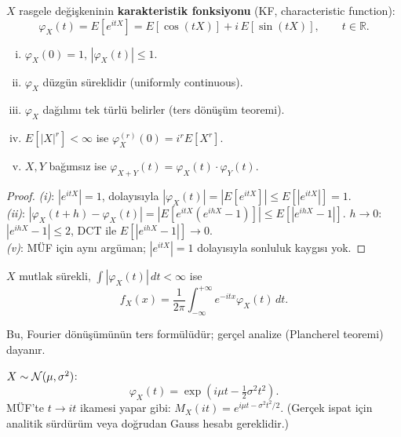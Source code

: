 \begin{tanim}
\label{def:kf}
$X$ rasgele değişkeninin \textbf{karakteristik fonksiyonu} (KF, characteristic function):
\[
  \varphi_X(t) = E[e^{itX}] = E[\cos(tX)] + i \, E[\sin(tX)], \qquad t \in \mathbb{R}.
\]
\end{tanim}

\begin{teorem}
\label{thm:kf_ozellik}
\begin{enumerate}[(i)]
  \item $\varphi_X(0) = 1$, $|\varphi_X(t)| \leq 1$.
  \item $\varphi_X$ düzgün süreklidir (uniformly continuous).
  \item $\varphi_X$ dağılımı tek türlü belirler (ters dönüşüm teoremi).
  \item $E[|X|^r] < \infty$ ise $\varphi_X^{(r)}(0) = i^r E[X^r]$.
  \item $X, Y$ bağımsız ise $\varphi_{X+Y}(t) = \varphi_X(t) \cdot \varphi_Y(t)$.
\end{enumerate}
\end{teorem}

\begin{proof}
\textit{(i)}: $|e^{itX}| = 1$, dolayısıyla $|\varphi_X(t)| = |E[e^{itX}]| \leq E[|e^{itX}|] = 1$.\\
\textit{(ii)}: $|\varphi_X(t+h) - \varphi_X(t)| = |E[e^{itX}(e^{ihX}-1)]| \leq E[|e^{ihX}-1|]$.
$h \to 0$: $|e^{ihX}-1| \leq 2$, DCT ile $E[|e^{ihX}-1|] \to 0$.\\
\textit{(v)}: MÜF için aynı argüman; $|e^{itX}|=1$ dolayısıyla sonluluk kaygısı yok.
\end{proof}

\begin{teorem}
\label{thm:kf_ters}
$X$ mutlak sürekli, $\int |\varphi_X(t)| \, dt < \infty$ ise
\[
  f_X(x) = \frac{1}{2\pi} \int_{-\infty}^{+\infty} e^{-itx} \varphi_X(t) \, dt.
\]
\end{teorem}

Bu, Fourier dönüşümünün ters formülüdür; gerçel analize (Plancherel teoremi) dayanır.

\begin{ornek}
$X \sim \mathcal{N}(\mu, \sigma^2)$:
\[
  \varphi_X(t) = \exp\!\left(i\mu t - \tfrac{1}{2}\sigma^2 t^2\right).
\]
MÜF'te $t \to it$ ikamesi yapar gibi: $M_X(it) = e^{i\mu t - \sigma^2 t^2/2}$.
(Gerçek ispat için analitik sürdürüm veya doğrudan Gauss hesabı gereklidir.)
\end{ornek}

